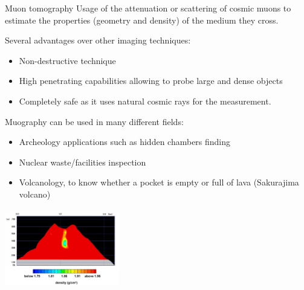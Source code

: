 \documentclass[handout,8 pt]{beamer}
\begin{document}
\begin{frame}{Muon tomography}
Usage of the attenuation or scattering of cosmic muons to estimate the properties (geometry and density) of the medium they cross. \vfill

Several advantages over other imaging techniques:
\begin{itemize}
\justifying
\item Non-destructive technique
\item High penetrating capabilities allowing to probe large and dense objects
\item Completely safe as it uses natural cosmic rays for the measurement.
\end{itemize} \vspace{10pt}

\begin{minipage}[c]{.54\textwidth}
\justifying

	Muography can be used in many different fields:
\begin{itemize}
	\justifying
	\item Archeology applications such as hidden chambers finding 
	\item Nuclear waste/facilities inspection
	\item Volcanology, to know whether a pocket is empty or full of lava (Sakurajima volcano)
\end{itemize}	
	
\end{minipage} \hfill
\begin{minipage}[c]{.44\textwidth}
	\begin{center}
	\includegraphics[width=5cm, height=3.5cm]{figs/volcano.jpg}
	\end{center}
\end{minipage} \hfill \vfill
\end{frame}
\end{document}
